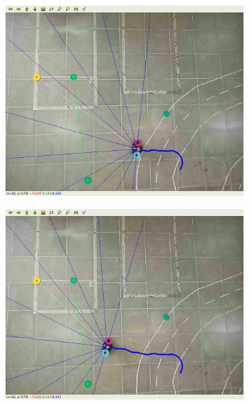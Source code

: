 \begin{figure}[htbp]
\begin{subfigure}[b]{0.115\textwidth}
        \includegraphics[width=\textwidth]{images/test_env1/3.png}
    \end{subfigure}
    \hfill
    \begin{subfigure}[b]{0.115\textwidth}
        \includegraphics[width=\textwidth]{images/test_env1/4.png}
    \end{subfigure}
    \newline
    \begin{subfigure}[b]{0.115\textwidth}

\end{subfigure}
\end{figure}
